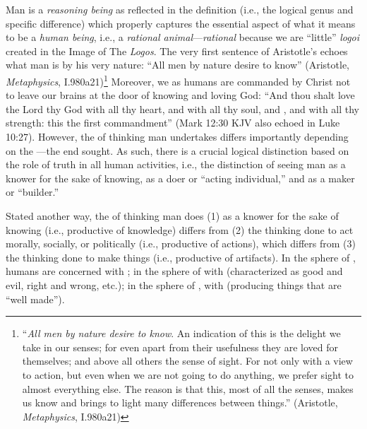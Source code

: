 Man is a \textit{reasoning being} as reflected in the definition (i.e., the logical genus and specific difference) which properly captures the essential aspect of what it means to be a \textit{human being}, i.e., a \textit{rational animal}---\textit{rational} because we are ``little'' \textit{logoi} created in the Image of The \textit{Logos}.
The very first sentence of Aristotle's  echoes what man is by his very nature: ``All men by nature desire to know'' (Aristotle, \textit{Metaphysics}, I.980a21)\footnote{``\emph{All men by nature desire to know}. An indication of this is the delight we take in our senses; for even apart from their usefulness they are loved for themselves; and above all others the sense of sight. For not only with a view to action, but even when we are not going to do anything, we prefer sight to almost everything else. The reason is that this, most of all the senses, makes us know and brings to light many differences between things.'' (Aristotle, \textit{Metaphysics}, I.980a21)} Moreover, we as humans are commanded by Christ not to leave our brains at the door of knowing and loving God: ``And thou shalt love the Lord thy God with all thy heart, and with all thy soul, and , and with all thy strength: this  the first commandment'' (Mark 12:30 KJV also echoed in Luke 10:27). However, the  of thinking man undertakes differs importantly depending on the ---the end sought. As such, there is a crucial logical distinction based on the role of truth in all human activities, i.e., the distinction of seeing man as a knower for the sake of knowing, as a doer or ``acting individual,'' and as a maker or ``builder.''

Stated another way, the  of thinking man does (1) as a knower for the sake of knowing (i.e., productive of knowledge) differs from (2) the thinking done to act morally, socially, or politically (i.e., productive of actions), which differs from (3) the thinking done to make things (i.e., productive of artifacts). In the sphere of , humans are concerned with ; in the sphere of  with  (characterized as good and evil, right and wrong, etc.); in the sphere of , with  (producing things that are ``well made'').


